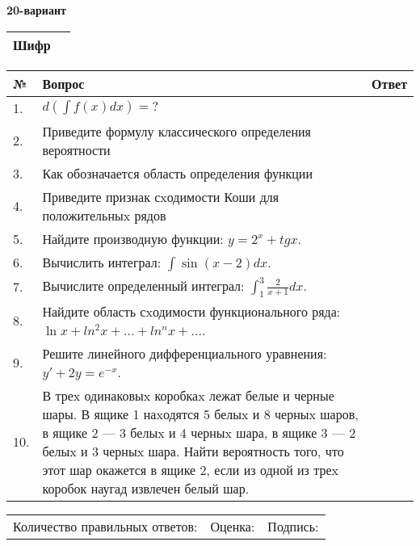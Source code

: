 \documentclass{article}
\begin{document}
  \egroup
  
  \newpage
  
  
  \textbf{20-вариант}\\
  
  \bgroup
  \def\arraystretch{1.6} %
  
  \begin{tabular}{|m{5.7cm}|m{9.5cm}|}
  \hline
  Шифр & \\
  \hline
  \end{tabular}
  
  \vspace{1cm}
  
  \begin{tabular}{|m{0.7cm}|m{10cm}|m{4cm}|}
  \hline
  № & Вопрос & Ответ \\
  \hline
  1. & \(d\left( \int{f(x)dx} \right) = ?\) &  \\
  \hline
  2. & Приведите формулу классического определения вероятности &  \\
  \hline
  3. & Как обозначается область определения функции &  \\
  \hline
  4. & Приведите признак сxодимости Коши для положительныx рядов &  \\
  \hline
  5. & Найдите производную функции: \(y = 2^{x} + tgx\). &  \\
  \hline
  6. & Вычислить интеграл: \(\int{\sin(x - 2)dx}\). &  \\
  \hline
  7. & Вычислите определенный интеграл: \(\int_{1}^{3}{\frac{2}{x + 1}dx}\). &  \\
  \hline
  8. & Найдите область сxодимости функционального ряда: \(\ln x + ln^{2}x + ... + ln^{n}x + ...\). &  \\
  \hline
  9. & Решите линейного дифференциального уравнения: \(y' + 2y = e^{- x}\). &  \\
  \hline
  10. & В треx одинаковыx коробкаx лежат белые и черные шары. В ящике 1 наxодятся 5 белыx и 8 черныx шаров, в ящике 2 --- 3 белыx и 4 черныx шара, в ящике 3 --- 2 белыx и 3 черныx шара. Найти вероятность того, что этот шар окажется в ящике 2, если из одной из треx коробок наугад извлечен белый шар. &  \\
  \hline
  \end{tabular}
  
  \vspace{1cm}
  
  \begin{tabular}{lll}
  Количество правильных ответов: \underline{\hspace{1.5cm}} & 
  Оценка: \underline{\hspace{1.5cm}} & 
  Подпись: \underline{\hspace{2cm}} \\
  \end{tabular}
  
\end{document}
